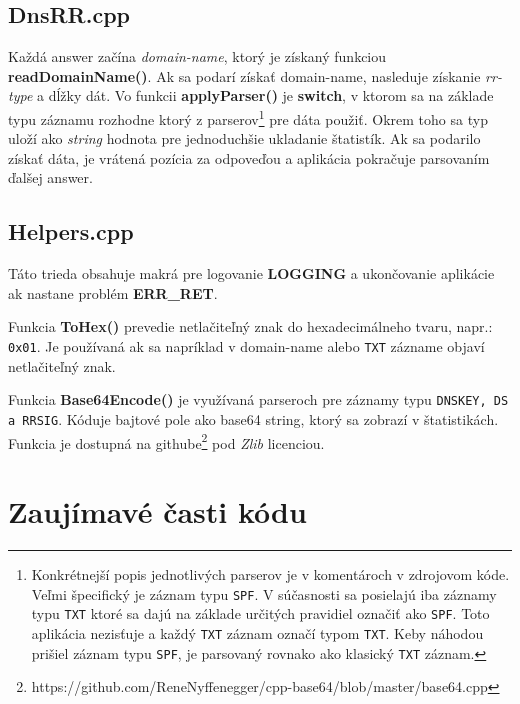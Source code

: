\documentclass{article}
\begin{document}
        \newpage

        \subsection{DnsRR.cpp}
        Každá answer začína \emph{domain-name}, ktorý je získaný funkciou \textbf{readDomainName()}. Ak sa podarí získať domain-name, nasleduje získanie \emph{rr-type} a dĺžky dát.
        Vo funkcii \textbf{applyParser()} je \textbf{switch}, v ktorom sa na základe typu záznamu rozhodne ktorý z parserov\footnote{Konkrétnejší popis jednotlivých parserov je v komentároch v zdrojovom kóde. 
        Veľmi špecifický je záznam typu \texttt{SPF}. V súčasnosti sa posielajú iba záznamy typu \texttt{TXT} ktoré sa dajú na základe určitých pravidiel označiť ako \texttt{SPF}. Toto aplikácia nezisťuje
        a každý \texttt{TXT} záznam označí typom \texttt{TXT}. Keby náhodou prišiel záznam typu \texttt{SPF}, je parsovaný rovnako ako klasický \texttt{TXT} záznam.} pre dáta použiť. Okrem toho sa typ uloží ako \emph{string}
        hodnota pre jednoduchšie ukladanie štatistík. Ak sa podarilo získať dáta, je vrátená pozícia za odpoveďou a aplikácia pokračuje parsovaním ďalšej answer.

        \subsection{Helpers.cpp}
        Táto trieda obsahuje makrá pre logovanie \textbf{LOGGING} a ukončovanie aplikácie ak nastane problém \textbf{ERR\_RET}.

        Funkcia \textbf{ToHex()} prevedie netlačiteľný znak do hexadecimálneho tvaru, napr.: \texttt{0x01}. Je používaná ak sa napríklad v domain-name alebo \texttt{TXT}
        zázname objaví netlačiteľný znak.

        Funkcia \textbf{Base64Encode()} je využívaná parseroch pre záznamy typu \texttt{DNSKEY, DS a RRSIG}. Kóduje bajtové pole ako base64 string, ktorý sa zobrazí v štatistikách.
        Funkcia je dostupná na githube\footnote{https://github.com/ReneNyffenegger/cpp-base64/blob/master/base64.cpp} pod \emph{Zlib} licenciou. 

        \newpage

    \section{Zaujímavé časti kódu}
\end{document}
